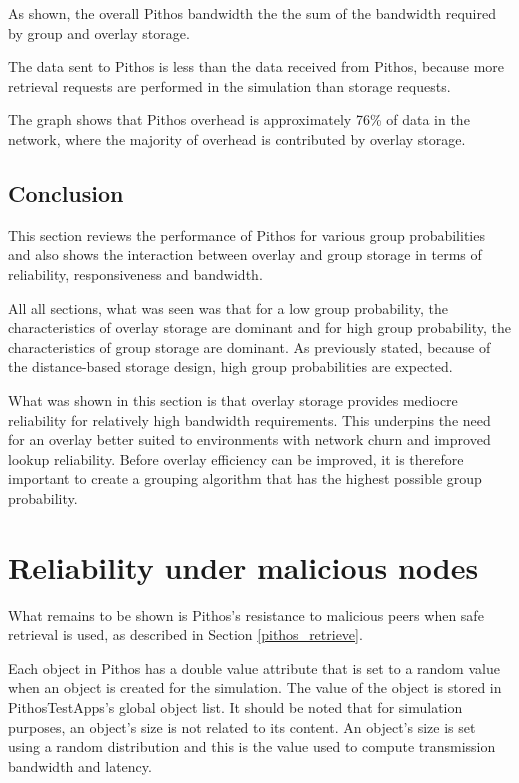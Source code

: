 As shown, the overall Pithos bandwidth the the sum of the bandwidth required by group and overlay storage.

The data sent to Pithos is less than the data received from Pithos, because more retrieval requests are performed in the simulation than storage requests.

The graph shows that Pithos overhead is approximately 76\% of data in the network, where the majority of overhead is contributed by overlay storage.

\subsection{Conclusion}

This section reviews the performance of Pithos for various group probabilities and also shows the interaction between overlay and group storage in terms of reliability, responsiveness and bandwidth.

All all sections, what was seen was that for a low group probability, the characteristics of overlay storage are dominant and for high group probability, the characteristics of group storage are dominant. As previously stated, because of the distance-based storage design, high group probabilities are expected.

What was shown in this section is that overlay storage provides mediocre reliability for relatively high bandwidth requirements. This underpins the need for an overlay better suited to environments with network churn and improved lookup reliability. Before overlay efficiency can be improved, it is therefore important to create a grouping algorithm that has the highest possible group probability.

\section{Reliability under malicious nodes}
\label{malicious_results}

What remains to be shown is Pithos's resistance to malicious peers when safe retrieval is used, as described in Section \ref{pithos_retrieve}.

Each object in Pithos has a double value attribute that is set to a random value when an object is created for the simulation. The value of the object is stored in PithosTestApps's global object list. It should be noted that for simulation purposes, an object's size is not related to its content. An object's size is set using a random distribution and this is the value used to compute transmission bandwidth and latency.

